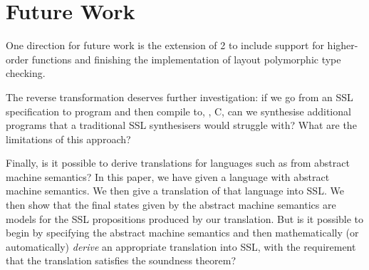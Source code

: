 \section{Future Work}
\label{sec:future-work}

One direction for future work is the extension of \Pika{} 2 to include support for higher-order functions and finishing the implementation of layout polymorphic type checking.

The reverse transformation deserves further investigation: if we go from
an SSL specification to \Pika{} program and then compile to, \eg, C, can
we synthesise additional programs that a traditional SSL synthesisers
would struggle with? What are the limitations of this approach?

Finally, is it possible to derive translations for languages such as \Pika{}
from abstract machine semantics? In this paper, we have given a
language with abstract machine semantics. We then give a translation
of that language into SSL. We then show that the final states given by
the abstract machine semantics are models for the SSL propositions
produced by our translation. But is it possible to begin by specifying the
abstract machine semantics and then mathematically (or automatically)
\textit{derive} an appropriate translation into SSL, with the
requirement that the translation satisfies the soundness theorem?


